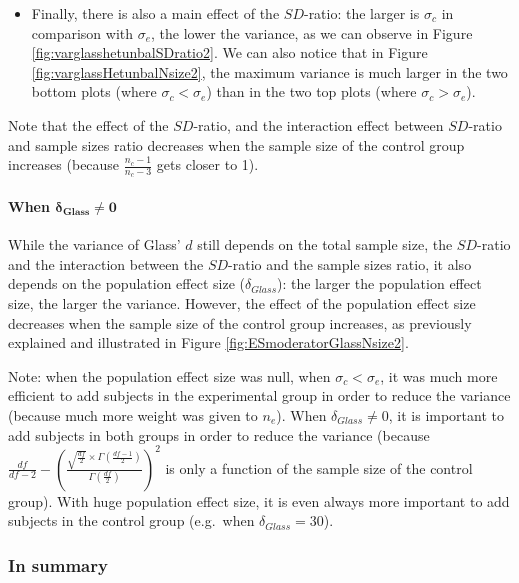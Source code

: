 \documentclass[
  english,
  man,mask]{apa6}
\providecommand{\tightlist}{%
  \setlength{\itemsep}{0pt}\setlength{\parskip}{0pt}}
\let\oldparagraph\paragraph
\renewcommand{\paragraph}[1]{\oldparagraph{#1}\mbox{}}
\begin{document}
\begin{itemize}
\tightlist
\item
  Finally, there is also a main effect of the \(SD\)-ratio: the larger is \(\sigma_c\) in comparison with \(\sigma_e\), the lower the variance, as we can observe in Figure \ref{fig:varglasshetunbalSDratio2}. We can also notice that in Figure \ref{fig:varglassHetunbalNsize2}, the maximum variance is much larger in the two bottom plots (where \(\sigma_c<\sigma_e\)) than in the two top plots (where \(\sigma_c>\sigma_e\)).
\end{itemize}

Note that the effect of the \(SD\)-ratio, and the interaction effect between \(SD\)-ratio and sample sizes ratio decreases when the sample size of the control group increases (because \(\frac{n_c-1}{n_c-3}\) gets closer to 1).

\hypertarget{when-bmdelta_glass-neq-0-2}{%
\paragraph{\texorpdfstring{When \(\bm{\delta_{Glass} \neq 0}\)}{When \textbackslash bm\{\textbackslash delta\_\{Glass\} \textbackslash neq 0\}}}\label{when-bmdelta_glass-neq-0-2}}

While the variance of Glass' \(d\) still depends on the total sample size, the \(SD\)-ratio and the interaction between the \(SD\)-ratio and the sample sizes ratio, it also depends on the population effect size (\(\delta_{Glass}\)): the larger the population effect size, the larger the variance. However, the effect of the population effect size decreases when the sample size of the control group increases, as previously explained and illustrated in Figure \ref{fig:ESmoderatorGlassNsize2}.

Note: when the population effect size was null, when \(\sigma_c<\sigma_e\), it was much more efficient to add subjects in the experimental group in order to reduce the variance (because much more weight was given to \(n_e\)). When \(\delta_{Glass} \neq 0\), it is important to add subjects in both groups in order to reduce the variance (because \(\frac{df}{df-2} - \left( \frac{\sqrt{\frac{df}{2}} \times \Gamma \left(\frac{df-1}{2} \right)}{\Gamma \left( \frac{df}{2}\right)}\right)^2\) is only a function of the sample size of the control group). With huge population effect size, it is even always more important to add subjects in the control group (e.g.~when \(\delta_{Glass}=30\)).

\hypertarget{in-summary-1}{%
\subsubsection{In summary}\label{in-summary-1}}
\end{document}
